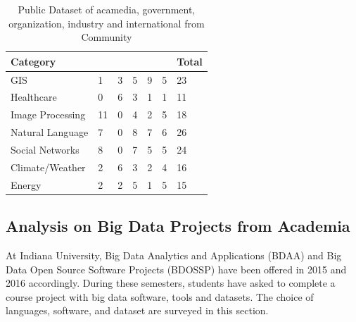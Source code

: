 \documentclass[9pt,twocolumn,twoside]{styles/osajnl}
\newcommand*\rot{\rotatebox{90}}
\begin{document}
\begin{table}[htb]
  \begin{center}
    \begin{small}
      \begin{tabular}{l|l|l|l|l|l|l}

    Category         & \rot{Academia} & \rot{Government} & \rot{Organization} & \rot{Industry} & \rot{International} & Total \\ \hline \hline
    GIS              & 1              & 3                & 5                  & 9              & 5                   & 23    \\ \hline
    Healthcare       & 0              & 6                & 3                  & 1              & 1                   & 11    \\ \hline
    Image Processing & 11             & 0                & 4                  & 2              & 5                   & 18    \\ \hline
    Natural Language & 7              & 0                & 8                  & 7              & 6                   & 26    \\ \hline
    Social Networks  & 8              & 0                & 7                  & 5              & 5                   & 24    \\ \hline
    Climate/Weather  & 2              & 6                & 3                  & 2              & 4                   & 16    \\ \hline
    Energy           & 2              & 2                & 5                  & 1              & 5                   & 15    \\ 

      \end{tabular}
      \caption{Public Dataset of acamedia, government, organization,
        industry and international from Community}
      \label{tab:dataset-sector}
    \end{small}
  \end{center}
\end{table}


\subsection{Analysis on Big Data Projects from Academia}

At Indiana University, Big Data Analytics and Applications (BDAA) and
Big Data Open Source Software Projects (BDOSSP) have been offered in
2015 and 2016 accordingly. During these semesters, students have asked
to complete a course project with big data software, tools and
datasets. The choice of languages, software, and dataset are
surveyed in this section.
\end{document}
